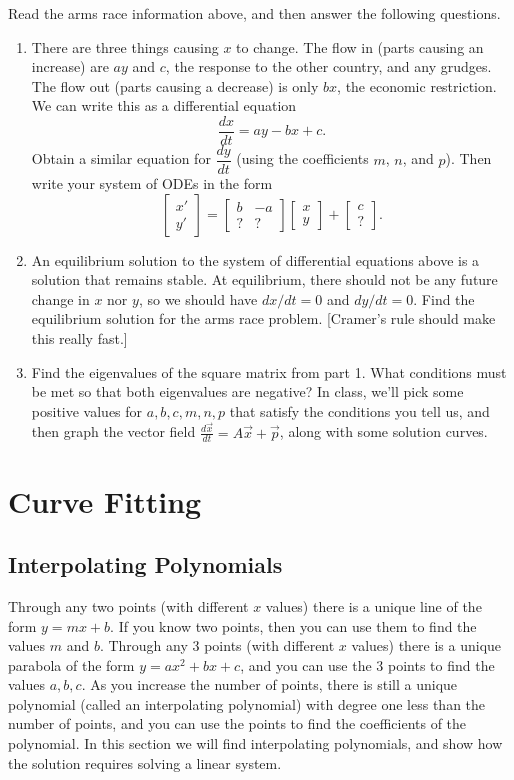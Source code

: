 \begin{problem}
Read the arms race information above, and then answer the following questions.
\begin{enumerate}
 \item There are three things causing $x$ to change. The flow in (parts causing an increase) are $ay$ and $c$, the response to the other country, and any grudges.  The flow out (parts causing a decrease) is only $bx$, the economic restriction.  We can write this as a differential equation $$\frac{dx}{dt} = ay-bx+c.$$ Obtain a similar equation for $\dfrac{dy}{dt}$ (using the coefficients $m$, $n$, and $p$). Then write your system of ODEs in the form 
$$
\begin{bmatrix}x'\\y'\end{bmatrix}
=
\begin{bmatrix}b&-a\\?&?\end{bmatrix}
\begin{bmatrix}x\\y\end{bmatrix}
+
\begin{bmatrix}c\\?\end{bmatrix}.
$$ 
 \item An equilibrium solution to the system of differential equations above is a solution that remains stable. At equilibrium, there should not be any future change in $x$ nor $y$, so we should have $dx/dt=0$ and $dy/dt=0$. Find the equilibrium solution for the arms race problem. [Cramer's rule should make this really fast.]
 \item Find the eigenvalues of the square matrix from part 1. What conditions must be met so that both eigenvalues are negative? In class, we'll pick some positive values for $a,b,c,m,n,p$ that satisfy the conditions you tell us, and then graph the vector field $\frac{d \vec x}{dt} = A\vec x+\vec p$, along with some solution curves.  
\end{enumerate}
\end{problem}


\section{Curve Fitting}
\subsection{Interpolating Polynomials}
Through any two points (with different $x$ values) there is a unique line of the form $y=mx+b$. If you know two points, then you can use them to find the values $m$ and $b$.  Through any 3 points (with different $x$ values) there is a unique parabola of the form $y=ax^2+bx+c$, and you can use the 3 points to find the values $a,b,c$.  As you increase the number of points, there is still a unique polynomial (called an interpolating polynomial) with degree one less than the number of points, and you can use the points to find the coefficients of the polynomial. In this section we will find interpolating polynomials, and show how the solution requires solving a linear system.


